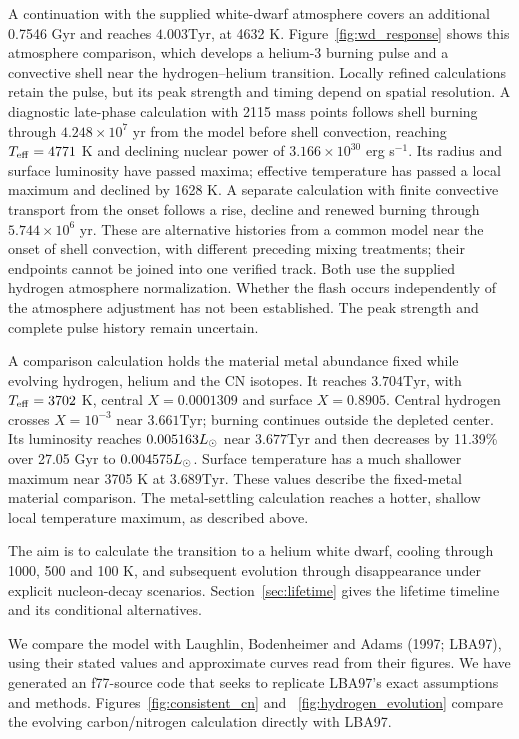 \documentclass[11pt,letterpaper]{article}
\newcommand{\Tyr}{\mathrm{Tyr}}
\begin{document}
A continuation with the supplied white-dwarf atmosphere covers an additional
0.7546 Gyr and reaches $4.003\Tyr$, at 4632 K.
Figure~\ref{fig:wd_response} shows this atmosphere comparison, which develops
a helium-3 burning pulse and a convective shell near the hydrogen--helium
transition. Locally refined calculations retain the pulse, but its peak
strength and timing depend on spatial resolution. A diagnostic late-phase
calculation with 2115 mass points follows shell burning through
$4.248\times10^7$ yr from the model before shell convection, reaching
$T_{\rm eff}=4771$ K and declining nuclear power of
$3.166\times10^{30}$ erg s$^{-1}$. Its radius and surface luminosity have passed maxima; effective temperature has passed a local maximum and declined by 1628 K. A separate calculation with finite
convective transport from the onset follows a rise, decline and renewed
burning through $5.744\times10^6$ yr. These are alternative histories from a
common model near the onset of shell convection, with different preceding
mixing treatments; their endpoints cannot be joined into one verified track.
Both use the supplied hydrogen atmosphere normalization. Whether the flash occurs independently of the atmosphere adjustment
has not been established.
The peak strength and complete pulse history
remain uncertain.



A comparison calculation holds the material metal abundance fixed while
evolving hydrogen, helium and the CN isotopes. It reaches $3.704\Tyr$,
with $T_{\rm eff}=3702$ K, central $X=0.0001309$ and surface $X=0.8905$.
Central hydrogen crosses $X=10^{-3}$ near $3.661\Tyr$; burning continues
outside the depleted center. Its luminosity reaches $0.005163L_\odot$ near
$3.677\Tyr$ and then decreases by 11.39\% over 27.05 Gyr to
$0.004575L_\odot$. Surface temperature has a much shallower maximum near
3705 K at $3.689\Tyr$. These values describe the fixed-metal material comparison. The metal-settling calculation reaches a hotter, shallow local
temperature maximum, as described above.

The aim is to calculate the transition to a helium white dwarf, cooling
through 1000, 500 and 100 K, and subsequent evolution through disappearance
under explicit nucleon-decay scenarios. Section~\ref{sec:lifetime} gives
the lifetime timeline and its conditional alternatives.

We compare the model with Laughlin, Bodenheimer and Adams (1997; LBA97),
using their stated values and approximate curves read from their figures.
We have generated an f77-source code that seeks to replicate LBA97's exact
assumptions and methods. Figures~\ref{fig:consistent_cn} and
~\ref{fig:hydrogen_evolution} compare the evolving carbon/nitrogen calculation
directly with LBA97.
\end{document}
